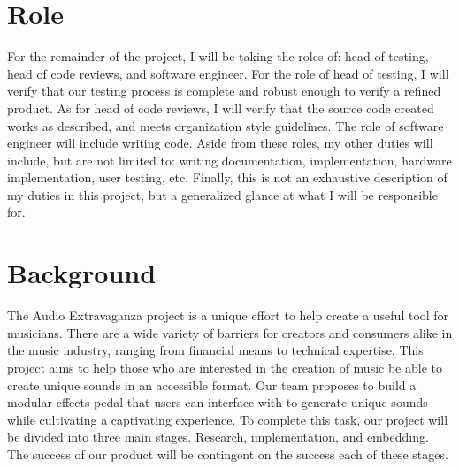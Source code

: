 \documentclass[onecolumn, draftclsnofoot,10pt, compsoc]{IEEEtran}
\begin{document}
\newpage
{}
\tableofcontents

\clearpage
\section{Role}
For the remainder of the project, I will be taking the roles of: head of testing, head of code reviews, and software engineer.
For the role of head of testing, I will verify that our testing process is complete and robust enough to verify a refined product.
As for head of code reviews, I will verify that the source code created works as described, and meets organization style guidelines.
The role of software engineer will include writing code.
Aside from these roles, my other duties will include, but are not limited to: writing documentation, implementation, hardware implementation, user testing, etc.
Finally, this is not an exhaustive description of my duties in this project, but a generalized glance at what I will be responsible for.
\section{Background}
The Audio Extravaganza project is a unique effort to help create a useful tool for musicians.
There are a wide variety of barriers for creators and consumers alike in the music industry, ranging from financial means to technical expertise.
This project aims to help those who are interested in the creation of music be able to create unique sounds in an accessible format.
Our team proposes to build a modular effects pedal that users can interface with to generate unique sounds while cultivating a captivating experience.
To complete this task, our project will be divided into three main stages. Research, implementation, and embedding.
The success of our product will be contingent on the success each of these stages. 





\clearpage






\newpage
\end{document}

